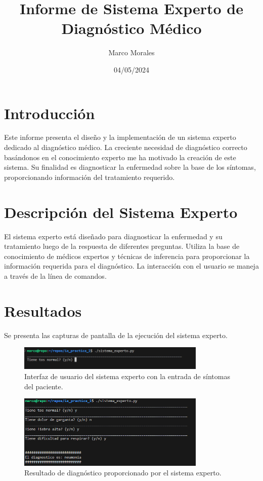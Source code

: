 \documentclass{article}
\title{Informe de Sistema Experto de Diagnóstico Médico}
\author{Marco Morales}
\date{04/05/2024}
\begin{document}
\maketitle

\section{Introducción}

Este informe presenta el diseño y la implementación de un sistema experto dedicado al diagnóstico médico. La creciente necesidad de diagnóstico correcto basándonos en el conocimiento experto me ha motivado la creación de este sistema. 
Su finalidad es diagnosticar la enfermedad sobre la base de los síntomas, proporcionando información del tratamiento requerido.

\section{Descripción del Sistema Experto}

El sistema experto está diseñado para diagnosticar la enfermedad y su tratamiento luego de la respuesta de diferentes preguntas. Utiliza la base de conocimiento de médicos expertos y técnicas de inferencia para proporcionar la información requerida para el diagnóstico. La interacción con el usuario se maneja a través de la línea de comandos.

\section{Resultados}

Se presenta las capturas de pantalla de la ejecución del sistema experto.

\begin{figure}[h!]
  \centering
  \includegraphics[width=0.8\textwidth]{1.png}
  \caption{Interfaz de usuario del sistema experto con la entrada de síntomas del paciente.}
\end{figure}

\begin{figure}[h!]
  \centering
  \includegraphics[width=0.8\textwidth]{2.png}
  \caption{Resultado de diagnóstico proporcionado por el sistema experto.}
\end{figure}
\end{document}
